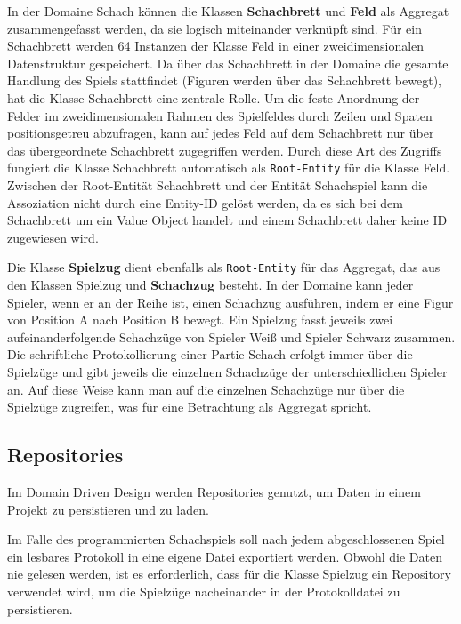 In der Domaine \glqq Schach\grqq{} können die Klassen \textbf{Schachbrett} und \textbf{Feld} als Aggregat zusammengefasst werden, da sie logisch miteinander verknüpft sind. 
Für ein Schachbrett werden 64 Instanzen der Klasse Feld in einer zweidimensionalen Datenstruktur gespeichert. 
Da über das Schachbrett in der Domaine die gesamte Handlung des Spiels stattfindet (Figuren werden über das Schachbrett bewegt), hat die Klasse Schachbrett eine zentrale Rolle.
Um die feste Anordnung der Felder im zweidimensionalen Rahmen des Spielfeldes durch Zeilen und Spaten positionsgetreu abzufragen, kann auf jedes Feld auf dem Schachbrett nur über das übergeordnete Schachbrett zugegriffen werden. 
Durch diese Art des Zugriffs fungiert die Klasse Schachbrett automatisch als \texttt{Root-Entity} für die Klasse Feld.
Zwischen der Root-Entität Schachbrett und der Entität Schachspiel kann die Assoziation nicht durch eine Entity-ID gelöst werden, da es sich bei dem Schachbrett um ein Value Object handelt und einem Schachbrett daher keine ID zugewiesen wird. 

Die Klasse \textbf{Spielzug} dient ebenfalls als \texttt{Root-Entity} für das Aggregat, das aus den Klassen  Spielzug und \textbf{Schachzug} besteht. 
In der Domaine kann jeder Spieler, wenn er an der Reihe ist, einen Schachzug ausführen, indem er eine Figur von Position A nach Position B bewegt. 
Ein Spielzug fasst jeweils zwei aufeinanderfolgende Schachzüge von Spieler \glqq Weiß\grqq{} und Spieler \glqq Schwarz\grqq{} zusammen. 
Die schriftliche Protokollierung einer Partie Schach erfolgt immer über die Spielzüge und gibt jeweils die einzelnen Schachzüge der unterschiedlichen Spieler an. 
Auf diese Weise kann man auf die einzelnen Schachzüge nur über die Spielzüge zugreifen, was für eine Betrachtung als Aggregat spricht.  

\subsection{Repositories}

Im Domain Driven Design werden Repositories genutzt, um Daten in einem Projekt zu persistieren und zu laden. 

Im Falle des programmierten Schachspiels soll nach jedem abgeschlossenen Spiel ein lesbares Protokoll in eine eigene Datei exportiert werden.
Obwohl die Daten nie gelesen werden, ist es erforderlich, dass für die Klasse Spielzug ein Repository verwendet wird, um die Spielzüge nacheinander in der Protokolldatei zu persistieren. 

